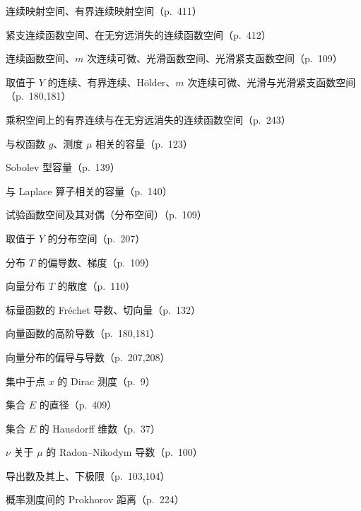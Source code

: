 \documentclass[../main.tex]{subfiles}
\begin{document}
\begin{description}[style=nextline,leftmargin=1.2em,itemsep=1pt,topsep=2pt,font=\normalfont\small]
\item[{$C(X;Y),\ C_b(X;Y),\ C(X),\ C_b(X)$}] 连续映射空间、有界连续映射空间（p.~411）
\item[{$C_c(X),\ C_0(X)$}] 紧支连续函数空间、在无穷远消失的连续函数空间（p.~412）
\item[{$C(U),\ C^m(U),\ C^\infty(U),\ C^\infty_c(U)$}] 连续函数空间、$m$ 次连续可微、光滑函数空间、光滑紧支函数空间（p.~109）
\item[{$C(U;Y),\ C_b(U;Y),\ C^\alpha(U;Y),\ C^m(U;Y),\ C^\infty(U;Y),\ C^\infty_c(U;Y)$}] 取值于 $Y$ 的连续、有界连续、Hölder、$m$ 次连续可微、光滑与光滑紧支函数空间（p.~180,181）
\item[{$C_b(X\times Y),\ C_0(X\times Y)$}] 乘积空间上的有界连续与在无穷远消失的连续函数空间（p.~243）
\item[{$C_{\mu,g,p}(E),\ C_{g,p}(E),\ C_{g,1}(E)$}] 与权函数 $g$、测度 $\mu$ 相关的容量（p.~123）
\item[{$C_{m,p}(E)$}] Sobolev 型容量（p.~139）
\item[{$C_{\Delta,1}(K)$}] 与 Laplace 算子相关的容量（p.~140）
\item[{$\mathcal{D}(U),\ \mathcal{D}^*(U)$}] 试验函数空间及其对偶（分布空间）（p.~109）
\item[{$\mathcal{D}'(U;Y)$}] 取值于 $Y$ 的分布空间（p.~207）
\item[{$\dfrac{\partial_T}{\partial x_k},\ \nabla_T$}] 分布 $T$ 的偏导数、梯度（p.~109）
\item[{$\operatorname{div}T$，$T\equiv(T_1,\cdots ,T_N)$}] 向量分布 $T$ 的散度（p.~110）
\item[{$Df(x_0),\ f'(x_0)$（标量函数）}] 标量函数的 Fréchet 导数、切向量（p.~132）
\item[{$D^\alpha f,\ f^{(m)}(x_0)$（向量函数）}] 向量函数的高阶导数（p.~180,181）
\item[{$D_T^\alpha,\ \dfrac{dT}{dx}$（向量分布）}] 向量分布的偏导与导数（p.~207,208）
\item[{$\delta_x$}] 集中于点 $x$ 的 Dirac 测度（p.~9）
\item[{$\operatorname{diam}E$}] 集合 $E$ 的直径（p.~409）
\item[{$\dim_H(E)$}] 集合 $E$ 的 Hausdorff 维数（p.~37）
\item[{$\dfrac{d\nu}{d\mu}$}] $\nu$ 关于 $\mu$ 的 Radon--Nikodym 导数（p.~100）
\item[{$D_{\mu\nu},\ \overline{D}_{\mu\nu},\ \widetilde{D}_{\mu\nu}$}] 导出数及其上、下极限（p.~103,104）
\item[{$d_P(\mu_1,\mu_2)$}] 概率测度间的 Prokhorov 距离（p.~224）

\end{description}
\end{document}
